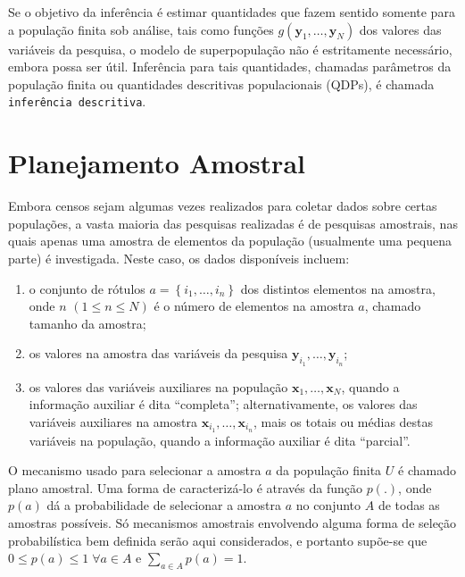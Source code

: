 \documentclass[]{book}
\theoremstyle{definition}
\theoremstyle{definition}
\theoremstyle{definition}
\theoremstyle{remark}
\begin{document}
Se o objetivo da inferência é estimar quantidades que fazem sentido
somente para a população finita sob análise, tais como funções
\(g\left( \mathbf{y}_1 ,\ldots, \mathbf{y}_N \right)\) dos valores das
variáveis da pesquisa, o modelo de superpopulação não é estritamente
necessário, embora possa ser útil. Inferência para tais quantidades,
chamadas parâmetros da população finita ou quantidades descritivas
populacionais (QDPs), é chamada \texttt{inferência\ descritiva}.

\section{Planejamento Amostral}\label{planamo}

Embora censos sejam algumas vezes realizados para coletar dados sobre
certas populações, a vasta maioria das pesquisas realizadas é de
pesquisas amostrais, nas quais apenas uma amostra de elementos da
população (usualmente uma pequena parte) é investigada. Neste caso, os
dados disponíveis incluem:

\begin{enumerate}
\def\labelenumi{\arabic{enumi}.}
\item
  o conjunto de rótulos \(a=\left\{ i_1 ,\ldots, i_n \right\}\) dos
  distintos elementos na amostra, onde \(n\)
  \(\left( 1 \leq n \leq N \right)\) é o número de elementos na amostra
  \(a\), chamado tamanho da amostra;
\item
  os valores na amostra das variáveis da pesquisa
  \(\mathbf{y}_{i_1} ,\ldots, \mathbf{y}_{i_n}\);
\item
  os valores das variáveis auxiliares na população
  \(\mathbf{x}_1 ,\ldots, \mathbf{x}_N\), quando a informação auxiliar é
  dita ``completa''; alternativamente, os valores das variáveis
  auxiliares na amostra \(\mathbf{x}_{i_1} ,\ldots, \mathbf{x}_{i_n}\),
  mais os totais ou médias destas variáveis na população, quando a
  informação auxiliar é dita ``parcial''.
\end{enumerate}

O mecanismo usado para selecionar a amostra \(a\) da população finita
\(U\) é chamado plano amostral. Uma forma de caracterizá-lo é através da
função \(p\left( .\right)\), onde \(p(a)\) dá a probabilidade de
selecionar a amostra \(a\) no conjunto \(A\) de todas as amostras
possíveis. Só mecanismos amostrais envolvendo alguma forma de seleção
probabilística bem definida serão aqui considerados, e portanto supõe-se
que \(0 \leq p(a) \leq 1 \; \forall a \in A\) e
\(\sum_{a \in A} p(a)=1\).
\end{document}
